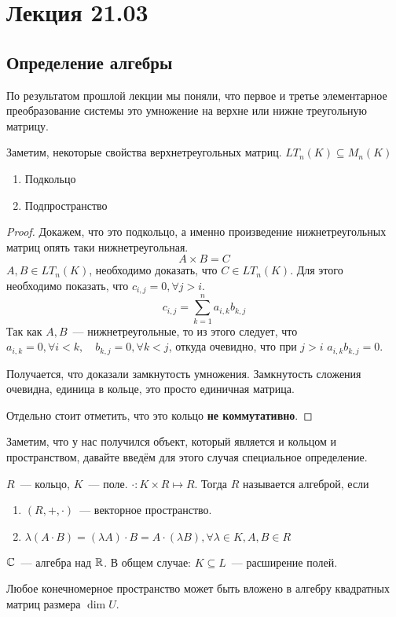 \section{Лекция 21.03}
\subsection{Определение алгебры}
\begin{remark}
    По результатом прошлой лекции мы поняли,
    что первое и третье элементарное преобразование системы
    это умножение на верхне или нижне треугольную матрицу.
\end{remark}
\begin{remark}
    Заметим, некоторые свойства верхнетреугольных матриц. $LT_n(K)\subseteq M_n(K)$ 
    \begin{enumerate}
        \item Подкольцо
        \item Подпространство
    \end{enumerate}
\end{remark}
\begin{proof}
    Докажем, что это подкольцо, а именно произведение нижнетреугольных матриц опять таки
    нижнетреугольная. 
    \[
        A \times B = C
    \] $A, B \in LT_n(K)$, необходимо доказать, что $C\in LT_n(K)$. 
    Для этого необходимо показать, что $c_{i, j} = 0, \forall j > i$.
    \[
        c_{i,j} = \sum\limits_{k=1}^{n}{a_{i,k} b_{k,j}}
    \]
    Так как $A, B$~--- нижнетреугольные, то из этого следует, что 
    $a_{i,k} = 0, \forall i < k,\quad b_{k, j} = 0, \forall k < j$, откуда
    очевидно, что при $j > i$ $a_{i,k}b_{k,j} = 0$.

    Получается, что доказали замкнутость умножения. Замкнутость сложения очевидна,
    единица в кольце, это просто единичная матрица. 

    Отдельно стоит отметить, что это кольцо \textbf{не коммутативно}.
\end{proof} 
\begin{motivation}
    Заметим, что у нас получился объект, который является и кольцом и пространством, давайте
    введём для этого случая специальное определение.
\end{motivation}
\begin{definition}
    $R$~--- кольцо, $K$~--- поле.
    $\cdot\colon K\times R\mapsto R$. Тогда $R$ называется алгеброй, если 
     \begin{enumerate}
         \item $\left(R,+,\cdot\right)$~--- векторное пространство.
         \item $\lambda(A\cdot B) = (\lambda A)\cdot B = A\cdot (\lambda B), \forall \lambda\in K, A,B\in R$
    \end{enumerate}
\end{definition}
\begin{example}
    $\mathbb{C}$~--- алгебра над $\mathbb{R}$. В общем случае: $K\subseteq L$~--- расширение полей.
\end{example}
\begin{statement}
     Любое конечномерное пространство может быть вложено в алгебру
     квадратных матриц размера $\dim U$.
\end{statement}
